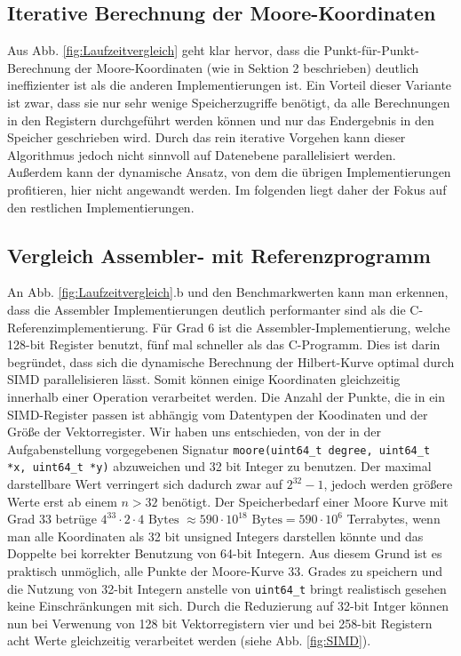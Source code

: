 \documentclass[course=erap]{aspdoc}
\begin{document}
 \FloatBarrier
 \subsection{Iterative Berechnung der Moore-Koordinaten}
Aus Abb. \ref{fig:Laufzeitvergleich} geht klar hervor, dass die Punkt-für-Punkt-Berechnung der Moore-Koordinaten (wie in Sektion 2 beschrieben) deutlich ineffizienter ist als die anderen Implementierungen ist. Ein Vorteil dieser Variante ist zwar, dass sie nur sehr wenige Speicherzugriffe benötigt, da alle Berechnungen in den Registern durchgeführt werden können und nur das Endergebnis in den Speicher geschrieben wird. Durch das rein iterative Vorgehen kann dieser Algorithmus jedoch nicht sinnvoll auf Datenebene parallelisiert werden. Außerdem kann der dynamische Ansatz, von dem die übrigen Implementierungen profitieren, hier nicht angewandt werden. Im folgenden liegt daher der Fokus auf den restlichen Implementierungen.

\subsection{Vergleich Assembler- mit Referenzprogramm}
An Abb. \ref{fig:Laufzeitvergleich}.b und den Benchmarkwerten kann man erkennen, dass die Assembler Implementierungen deutlich performanter sind als die C-Referenzimplementierung. 
Für Grad 6 ist die Assembler-Implementierung, welche 128-bit Register benutzt, fünf mal schneller als das C-Programm. Dies ist darin begründet, dass sich die dynamische Berechnung der Hilbert-Kurve optimal durch SIMD parallelisieren lässt.
Somit können einige Koordinaten gleichzeitig innerhalb einer Operation verarbeitet werden. Die Anzahl der Punkte, die in ein SIMD-Register passen ist abhängig vom Datentypen der Koodinaten und der Größe der Vektorregister.
Wir haben uns entschieden, von der in der Aufgabenstellung vorgegebenen Signatur \texttt{moore(uint64\_t degree, uint64\_t *x, uint64\_t *y)} abzuweichen und 32 bit Integer zu benutzen. Der maximal darstellbare Wert verringert sich dadurch zwar auf $2^{32}-1$, jedoch werden größere Werte erst ab einem $n > 32$ benötigt. Der Speicherbedarf einer Moore Kurve mit Grad 33 betrüge $4^{33} \cdot 2 \cdot 4 \text{ Bytes } \approx 590 \cdot 10^{18} \text{ Bytes} = 590 \cdot 10^6$ Terrabytes, wenn man alle Koordinaten als 32 bit unsigned Integers darstellen könnte und das Doppelte bei korrekter Benutzung von 64-bit Integern. Aus diesem Grund ist es praktisch unmöglich, alle Punkte der Moore-Kurve 33. Grades zu speichern und die Nutzung von 32-bit Integern anstelle von \texttt{uint64\_t} bringt realistisch gesehen keine Einschränkungen mit sich. \newline
Durch die Reduzierung auf 32-bit Intger können nun bei Verwenung von 128 bit Vektorregistern vier und bei 258-bit Registern acht Werte gleichzeitig verarbeitet werden (siehe Abb. \ref{fig:SIMD}).
\end{document}
